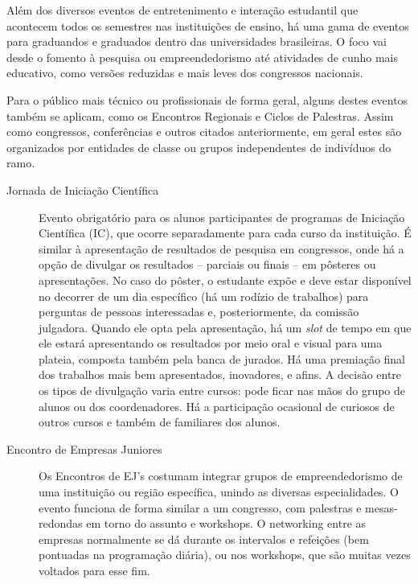 \documentclass[12pt,a4paper,twoside,hyphens,english,brazil]{abntex2}
\begin{document}
Além dos diversos eventos de entretenimento e interação estudantil que acontecem todos os semestres nas instituições de ensino, há uma gama de eventos para graduandos e graduados dentro das universidades brasileiras. O foco vai desde o fomento à pesquisa ou empreendedorismo até atividades de cunho mais educativo, como versões reduzidas e mais leves dos congressos nacionais.

Para o público mais técnico ou profissionais de forma geral, alguns destes eventos também se aplicam, como os Encontros Regionais e Ciclos de Palestras. Assim como congressos, conferências e outros citados anteriormente, em geral estes são organizados por entidades de classe ou grupos independentes de indivíduos do ramo.

\begin{description}
	\item[Jornada de Iniciação Científica] Evento obrigatório para os alunos participantes de programas de Iniciação Científica (IC), que ocorre separadamente para cada curso da instituição. É similar à apresentação de resultados de pesquisa em congressos, onde há a opção de divulgar os resultados -- parciais ou finais -- em pôsteres ou apresentações. No caso do pôster, o estudante expõe e deve estar disponível no decorrer de um dia específico (há um rodízio de trabalhos) para perguntas de pessoas interessadas e, posteriormente, da comissão julgadora. Quando ele opta pela apresentação, há um \emph{slot} de tempo em que ele estará apresentando os resultados por meio oral e visual para uma plateia, composta também pela banca de jurados. Há uma premiação final dos trabalhos mais bem apresentados, inovadores, e afins. A decisão entre os tipos de divulgação varia entre cursos: pode ficar nas mãos do grupo de alunos ou dos coordenadores. Há a participação ocasional de curiosos de outros cursos e também de familiares dos alunos.
			
	\item[Encontro de Empresas Juniores] Os Encontros de EJ's costumam integrar grupos de empreendedorismo de uma instituição ou região específica, unindo as diversas especialidades. O evento funciona de forma similar a um congresso, com palestras e mesas-redondas em torno do assunto e workshops. O networking entre as empresas normalmente se dá durante os intervalos e refeições (bem pontuadas na programação diária\cite{enej15}), ou nos workshops, que são muitas vezes voltados para esse fim.


\end{description}
\end{document}
